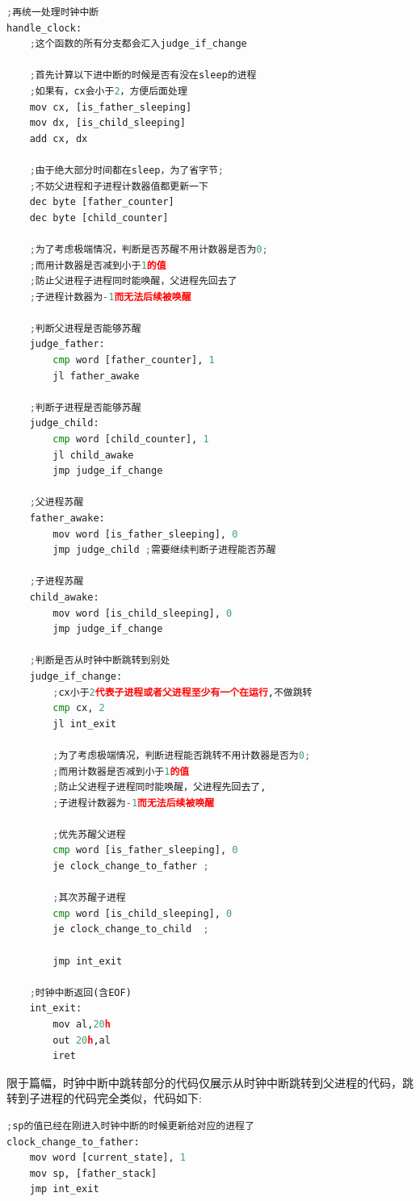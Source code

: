 \documentclass{LabReport}
\begin{document}
	\begin{lstlisting}[language=python,frame=shadowbox]
;再统一处理时钟中断
handle_clock:
	;这个函数的所有分支都会汇入judge_if_change

	;首先计算以下进中断的时候是否有没在sleep的进程 
	;如果有，cx会小于2，方便后面处理
	mov cx, [is_father_sleeping]
	mov dx, [is_child_sleeping]
	add cx, dx
	
	;由于绝大部分时间都在sleep，为了省字节;
	;不妨父进程和子进程计数器值都更新一下
	dec byte [father_counter]
	dec byte [child_counter]
	
	;为了考虑极端情况，判断是否苏醒不用计数器是否为0;
	;而用计数器是否减到小于1的值
	;防止父进程子进程同时能唤醒，父进程先回去了
	;子进程计数器为-1而无法后续被唤醒
	
	;判断父进程是否能够苏醒
	judge_father:
		cmp word [father_counter], 1
		jl father_awake
	
	;判断子进程是否能够苏醒
	judge_child:
		cmp word [child_counter], 1
		jl child_awake
		jmp judge_if_change
	
	;父进程苏醒
	father_awake:
		mov word [is_father_sleeping], 0
		jmp judge_child ;需要继续判断子进程能否苏醒
	
	;子进程苏醒
	child_awake:
		mov word [is_child_sleeping], 0
		jmp judge_if_change
	
	;判断是否从时钟中断跳转到别处
	judge_if_change:
		;cx小于2代表子进程或者父进程至少有一个在运行,不做跳转
		cmp cx, 2
		jl int_exit 
		
		;为了考虑极端情况，判断进程能否跳转不用计数器是否为0;
		;而用计数器是否减到小于1的值
		;防止父进程子进程同时能唤醒，父进程先回去了,
		;子进程计数器为-1而无法后续被唤醒
		
		;优先苏醒父进程
		cmp word [is_father_sleeping], 0
		je clock_change_to_father ;
		
		;其次苏醒子进程
		cmp word [is_child_sleeping], 0
		je clock_change_to_child  ;
		
		jmp int_exit
	
	;时钟中断返回(含EOF)
	int_exit:
		mov al,20h
		out 20h,al
		iret
	\end{lstlisting}
	
	限于篇幅，时钟中断中跳转部分的代码仅展示从时钟中断跳转到父进程的代码，跳转到子进程的代码完全类似，代码如下:
	\begin{lstlisting}[language=python,frame=shadowbox]
;sp的值已经在刚进入时钟中断的时候更新给对应的进程了
clock_change_to_father:
	mov word [current_state], 1
	mov sp, [father_stack]
	jmp int_exit
	\end{lstlisting}
	
\end{document}
